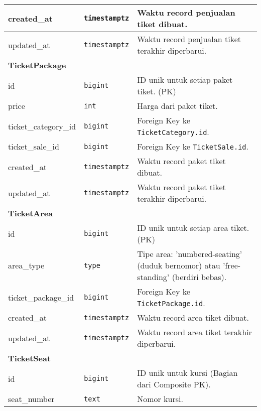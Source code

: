 \begin{longtable}{|l|p{}|p{}|}
	\hline
	created\_at 	& \texttt{timestamptz} 	& Waktu record penjualan tiket dibuat. 																												\\
	\hline
	updated\_at 	& \texttt{timestamptz} 	& Waktu record penjualan tiket terakhir diperbarui. 																								\\
	\hline
	\multicolumn{3}{|l|}{\textbf{TicketPackage}} \\
	\hline
	id 					& \texttt{bigint} 		& ID unik untuk setiap paket tiket. (PK) 																											\\
	\hline
	price 				& \texttt{int} 			& Harga dari paket tiket. 																															\\
	\hline
	ticket\_category\_id & \texttt{bigint} 		& Foreign Key ke \texttt{TicketCategory.id}. 																										\\
	\hline
	ticket\_sale\_id 	& \texttt{bigint} 		& Foreign Key ke \texttt{TicketSale.id}. 																											\\
	\hline
	created\_at 		& \texttt{timestamptz} 	& Waktu record paket tiket dibuat. 																													\\
	\hline
	updated\_at 		& \texttt{timestamptz} 	& Waktu record paket tiket terakhir diperbarui. 																									\\
	\hline
	\multicolumn{3}{|l|}{\textbf{TicketArea}} \\
	\hline
	id 					& \texttt{bigint} 		& ID unik untuk setiap area tiket. (PK) 																											\\
	\hline
	area\_type 			& \texttt{type} 			& Tipe area: 'numbered-seating' (duduk bernomor) atau 'free-standing' (berdiri bebas). 												\\
	\hline
	ticket\_package\_id & \texttt{bigint} 		& Foreign Key ke \texttt{TicketPackage.id}. 																										\\
	\hline
	created\_at 		& \texttt{timestamptz} 	& Waktu record area tiket dibuat. 																													\\
	\hline
	updated\_at 		& \texttt{timestamptz} 	& Waktu record area tiket terakhir diperbarui. 																									\\
	\hline
	\multicolumn{3}{|l|}{\textbf{TicketSeat}} \\
	\hline
	id 					& \texttt{bigint} 		& ID unik untuk kursi (Bagian dari Composite PK). 																								\\
	\hline
	seat\_number 		& \texttt{text} 			& Nomor kursi. 																																	\\

\end{longtable}
